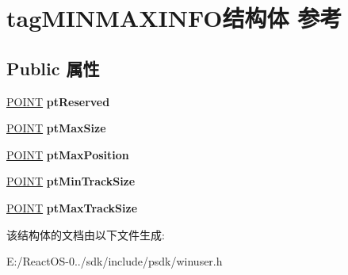 \hypertarget{structtag_m_i_n_m_a_x_i_n_f_o}{}\section{tag\+M\+I\+N\+M\+A\+X\+I\+N\+F\+O结构体 参考}
\label{structtag_m_i_n_m_a_x_i_n_f_o}
\subsection*{Public 属性}
\begin{DoxyCompactItemize}
\item 
\mbox{\label{structtag_m_i_n_m_a_x_i_n_f_o_ac6fb46e6b2ba855489c75472b8f9c43c}} 
\hyperlink{structtag_p_o_i_n_t}{P\+O\+I\+NT} {\bfseries pt\+Reserved}
\item 
\mbox{\label{structtag_m_i_n_m_a_x_i_n_f_o_a2dab613e20c6a485c30e3f2a0401e7e4}} 
\hyperlink{structtag_p_o_i_n_t}{P\+O\+I\+NT} {\bfseries pt\+Max\+Size}
\item 
\mbox{\label{structtag_m_i_n_m_a_x_i_n_f_o_a0a27560250b16809efd350e27df91a3c}} 
\hyperlink{structtag_p_o_i_n_t}{P\+O\+I\+NT} {\bfseries pt\+Max\+Position}
\item 
\mbox{\label{structtag_m_i_n_m_a_x_i_n_f_o_ac6d20e99e6861f5fb1e2c1b6db40190f}} 
\hyperlink{structtag_p_o_i_n_t}{P\+O\+I\+NT} {\bfseries pt\+Min\+Track\+Size}
\item 
\mbox{\label{structtag_m_i_n_m_a_x_i_n_f_o_ae44a1b77404d0d752124cca72054647d}} 
\hyperlink{structtag_p_o_i_n_t}{P\+O\+I\+NT} {\bfseries pt\+Max\+Track\+Size}
\end{DoxyCompactItemize}


该结构体的文档由以下文件生成\+:\begin{DoxyCompactItemize}
\item 
E\+:/\+React\+O\+S-\/0../sdk/include/psdk/winuser.\+h\end{DoxyCompactItemize}
